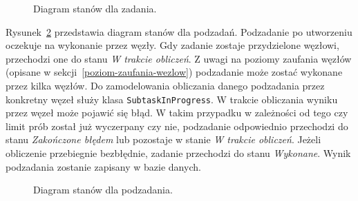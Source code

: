 \documentclass[a4paper,11pt,twoside]{report}
\theoremstyle{definition}
\begin{document}
\begin{figure} 
    \caption{Diagram stanów dla zadania.}
    \label{task-state-diagram}
\end{figure}

Rysunek~\ref{subtask-state-diagram} przedstawia diagram stanów dla podzadań. Podzadanie po utworzeniu oczekuje na wykonanie przez węzły. Gdy zadanie zostaje przydzielone węzłowi, przechodzi one do stanu \textit{W trakcie obliczeń}. Z uwagi na poziomy zaufania węzłów (opisane w sekcji~\ref{poziom-zaufania-wezlow}) podzadanie może zostać wykonane przez kilka węzłów. Do zamodelowania obliczania danego podzadania przez konkretny węzeł służy klasa \texttt{SubtaskInProgress}. W trakcie obliczania wyniku przez węzeł może pojawić się błąd. W takim przypadku w zależności od tego czy limit prób został już wyczerpany czy nie, podzadanie odpowiednio przechodzi do stanu \textit{Zakończone błędem} lub pozostaje w stanie \textit{W trakcie obliczeń}. Jeżeli obliczenie przebiegnie bezbłędnie, zadanie przechodzi do stanu \textit{Wykonane}. Wynik podzadania zostanie zapisany w bazie danych.

\begin{figure} 
    \caption{Diagram stanów dla podzadania.}
    \label{subtask-state-diagram}
\end{figure}
\end{document}
